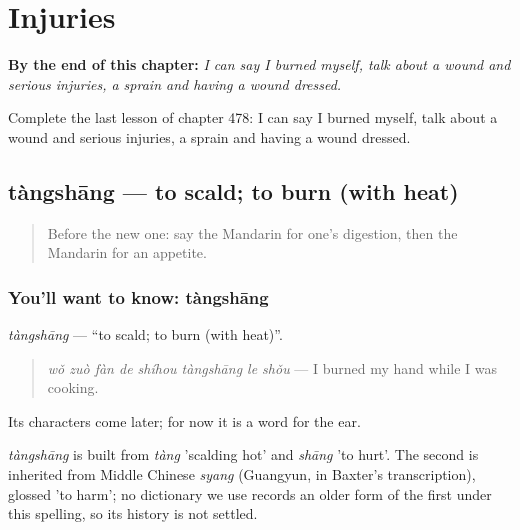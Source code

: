 
\chapter{Injuries}
\label{ch:zh-injuries}

\begin{chapteropening}
\textbf{By the end of this chapter:} \emph{I can say I burned myself, talk about a wound and serious injuries, a sprain and having a wound dressed.}

Complete the last lesson of chapter 478: I can say I burned myself, talk about a wound and serious injuries, a sprain and having a wound dressed.
\end{chapteropening}

\section[tàngshāng]{tàngshāng — to scald; to burn (with heat)}

\label{lesson:ZH-C478-tangshang}



\begin{quote}
Before the new one: say the Mandarin for one's digestion, then the Mandarin for an appetite.
\end{quote}

\subsection*{You'll want to know: tàngshāng}
\emph{tàngshāng} — \textquotedblleft{}to scald; to burn (with heat)\textquotedblright{}.

\begin{quote}
\emph{wǒ zuò fàn de shíhou tàngshāng le shǒu} — I burned my hand while I was cooking.
\end{quote}

Its characters come later; for now it is a word for the ear.

\begin{cousinweb}
\emph{tàngshāng} is built from \emph{tàng} 'scalding hot' and \emph{shāng} 'to hurt'. The second is inherited from Middle Chinese \emph{syang} (Guangyun, in Baxter's transcription), glossed 'to harm'; no dictionary we use records an older form of the first under this spelling, so its history is not settled.
\end{cousinweb}


